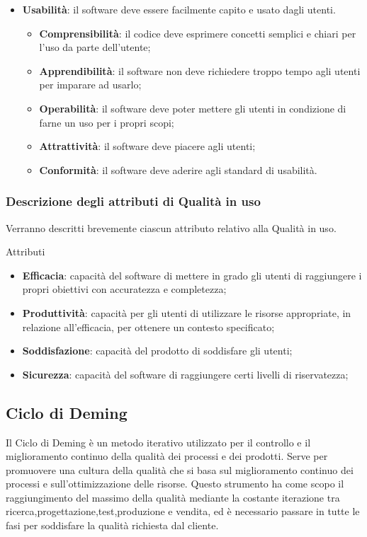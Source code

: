 \documentclass[../piano-di-qualifica.tex]{subfiles}
\begin{document}
\begin{itemize}
        \item \textbf{Usabilità}: il software deve essere facilmente capito e usato dagli utenti.
        \begin{itemize}
            \item \textbf{Comprensibilità}: il codice deve esprimere concetti semplici e chiari per l'uso da parte dell'utente;
            \item \textbf{Apprendibilità}: il software non deve richiedere troppo tempo agli utenti per imparare ad usarlo;
            \item \textbf{Operabilità}: il software deve poter mettere gli utenti in condizione di farne un uso per i propri scopi;
            \item \textbf{Attrattività}: il software deve piacere agli utenti;
            \item \textbf{Conformità}: il software deve aderire agli standard di usabilità.
        \end{itemize}
\end{itemize}


\subsubsection{Descrizione degli attributi di Qualità in uso}%
\label{sec:descrizione_attributi_in_uso}
Verranno descritti brevemente ciascun attributo relativo alla Qualità in uso.

Attributi
\begin{itemize}
    \item \textbf{Efficacia}: capacità del software di mettere in grado gli utenti di raggiungere i propri obiettivi con accuratezza e completezza;
    \item \textbf{Produttività}: capacità per gli utenti di utilizzare le risorse appropriate, in relazione all'efficacia, per ottenere un contesto specificato;
    \item \textbf{Soddisfazione}: capacità del prodotto di soddisfare gli utenti;
    \item \textbf{Sicurezza}: capacità del software di raggiungere certi livelli di riservatezza;
\end{itemize}

\subsection{Ciclo di Deming}%
\label{sec:ciclo_di_deming}
Il Ciclo di Deming è un metodo iterativo utilizzato per il controllo e il miglioramento continuo della qualità dei processi e dei prodotti.
Serve per promuovere una cultura della qualità che si basa sul miglioramento continuo dei processi e sull'ottimizzazione delle risorse.
Questo strumento ha come scopo il raggiungimento del massimo della qualità mediante la costante iterazione tra ricerca,progettazione,test,produzione e vendita, ed è necessario passare in tutte le fasi per soddisfare la qualità richiesta dal cliente.
\end{document}
